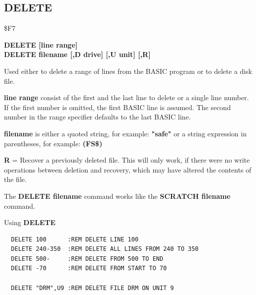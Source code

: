 \subsection{DELETE}
\begin{description}[leftmargin=2cm,style=nextline]
\item [Token:] \$F7
\item [Format:] {\bf DELETE [line range]} \\
                {\bf DELETE filename [,D drive] [,U unit] [,R]}
\item [Usage:] Used either to delete
               a range of lines from the BASIC program or
               to delete a disk file.

               {\bf line range} consist of the first and the last
               line to delete or a single line number.
               If the first number is omitted, the
               first BASIC line is assumed.
               The second number in the range specifier defaults
               to the last BASIC line.

   {\bf filename} is either a quoted string, for example: {\bf "safe"} or
   a string expression in parentheses, for example: {\bf (FS\$)}

   \drivedefinition

   \unitdefinition

   {\bf R} = Recover a previously deleted file.
   This will only work, if there were no write operations
   between deletion and recovery, which may have altered the
   contents of the file.

\item [Remarks:] The {\bf DELETE filename} command works like the
                 {\bf SCRATCH filename} command.

\item [Example:] Using {\bf DELETE}
\begin{tcolorbox}[colback=black,coltext=white]
\verbatimfont{\codefont}
\begin{verbatim}
  DELETE 100      :REM DELETE LINE 100
  DELETE 240-350  :REM DELETE ALL LINES FROM 240 TO 350
  DELETE 500-     :REM DELETE FROM 500 TO END
  DELETE -70      :REM DELETE FROM START TO 70

  DELETE "DRM",U9 :REM DELETE FILE DRM ON UNIT 9
\end{verbatim}
\end{tcolorbox}
\end{description}

